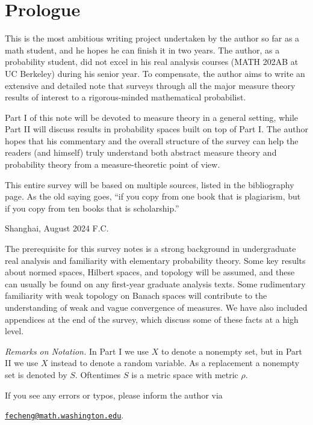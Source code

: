 \chapter*{\Large Prologue}

This is the most ambitious writing project undertaken by the author so far as a math student, and he hopes he can finish it in two years. The author, as a probability student, did not excel in his real analysis courses (MATH 202AB at UC Berkeley) during his senior year. To compensate, the author aims to write an extensive and detailed note that surveys through all the major measure theory results of interest to a rigorous-minded mathematical probabilist.

Part I of this note will be devoted to measure theory in a general setting, while Part II will discuss results in probability spaces built on top of Part I. The author hopes that his commentary and the overall structure of the survey can help the readers (and himself) truly understand both abstract measure theory and probability theory from a measure-theoretic point of view.

This entire survey will be based on multiple sources, listed in the bibliography page. As the old saying goes, ``if you copy from one book that is plagiarism, but if you copy from ten books that is scholarship.''
\vspace{1\baselineskip}

\noindent Shanghai, August 2024 \hfill F.C.

\vspace{3\baselineskip}
The prerequisite for this survey notes is a strong background in undergraduate real analysis and familiarity with elementary probability theory. Some key results about normed spaces, Hilbert spaces, and topology will be assumed, and these can usually be found on any first-year graduate analysis texts. Some rudimentary familiarity with weak topology on Banach spaces will contribute to the understanding of weak and vague convergence of measures. We have also included appendices at the end of the survey, which discuss some of these facts at a high level.

\emph{Remarks on Notation.} In Part I we use $X$ to denote a nonempty set, but in Part II we use $X$ instead to denote a random variable. As a replacement a nonempty set is denoted by $S$. Oftentimes $S$ is a metric space with metric $\rho$.
 
If you see any errors or typos, please inform the author via \begin{center}
    \href{mailto:fecheng@uw.edu}{\texttt{fecheng@math.washington.edu}}.
\end{center}